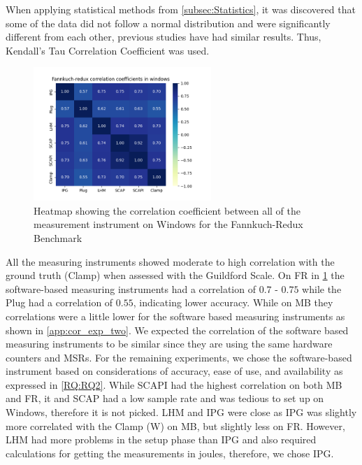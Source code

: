 


When applying statistical methods from \cref{subsec:Statistics}, it was discovered that some of the data did not follow a normal distribution and were significantly different from each other, previous studies \cite{biksbois, Koedijk2022diff} have had similar results. Thus, Kendall's Tau Correlation Coefficient was used.%

\begin{figure}[H]
    \centering
    \hspace*{-1cm} %
    \includegraphics[width=0.6\textwidth]{figures/Fannkuch-redux_ex2.png}
    \caption{Heatmap showing the correlation coefficient between all of the measurement instrument on Windows for the Fannkuch-Redux Benchmark}
    \label{fig:fannkuchCorr}
\end{figure}

All the measuring instruments showed moderate to high correlation with the ground truth (Clamp) when assessed with the Guildford Scale. On FR in \cref{fig:fannkuchCorr} the software-based measuring instruments had a correlation of $0.7$ - $0.75$ while the Plug had a correlation of $0.55$, indicating lower accuracy. While on MB they correlations were a little lower for the software based measuring instruments as shown in \cref{app:cor_exp_two}. We expected the correlation of the software based measuring instruments to be similar since they are using the same hardware counters and MSRs. For the remaining experiments, we chose the software-based instrument based on considerations of accuracy, ease of use, and availability as expressed in \cref{RQ:RQ2}. While SCAPI had the highest correlation on both MB and FR, it and SCAP had a low sample rate and was tedious to set up on Windows, therefore it is not picked. LHM and IPG were close as IPG was slightly more correlated with the Clamp (W) on MB, but slightly less on FR. However, LHM had more problems in the setup phase than IPG and also required calculations for getting the measurements in joules, therefore, we chose IPG. %